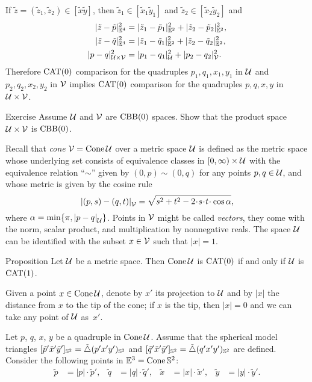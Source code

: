If $\tilde z=(\tilde z_1,\tilde z_2)\in [\tilde x\tilde y]$, then $\tilde z_1\in [\tilde x_1\tilde y_1]$ and $\tilde z_2\in [\tilde x_2\tilde y_2]$ and
\begin{align*}
\dist[2]{\tilde z}{\tilde p}{\EE^4}&=\dist[2]{\tilde z_1}{\tilde p_1}{\EE^2}+\dist[2]{\tilde z_2}{\tilde p_2}{\EE^2},
\\
\dist[2]{\tilde z}{\tilde q}{\EE^4}&=\dist[2]{\tilde z_1}{\tilde q_1}{\EE^2}+\dist[2]{\tilde z_2}{\tilde q_2}{\EE^2},
\\
\dist[2]{p}{q}{\spc{U}\times\spc{V}}&=\dist[2]{p_1}{q_1}{\spc{U}}+\dist[2]{p_2}{q_2}{\spc{V}}.
\end{align*}
Therefore $\mathrm{CAT}(0)$ comparison for the quadruples $p_1,q_1,x_1,y_1$ in $\mathcal{U}$
and 
$p_2,q_2,x_2,y_2$ in $\mathcal{V}$ implies 
$\mathrm{CAT}(0)$ comparison for the quadruples $p,q,x,y$ in $\mathcal{U}\times \mathcal{V}$.
\qeds

\begin{thm}{Exercise}\label{ex:product-CBB}
Assume $\mathcal{U}$ and $\mathcal{V}$ are $\mathrm{CBB}(0)$ spaces.
Show that the product space $\mathcal{U}\times\mathcal{V}$ is $\mathrm{CBB}(0)$.
\end{thm}

Recall that \label{page:cone}\emph{cone} $\mathcal{V}=\mathop{\rm Cone}\nolimits\mathcal{U}$ over a metric space $\mathcal{U}$
is defined as the metric space whose underlying set consists of
equivalence classes in
$[0,\infty)\times \mathcal{U}$ with the equivalence relation ``$\sim$'' given by $(0,p)\sim (0,q)$ for any points $p,q\in\mathcal{U}$,
and whose metric is given by the cosine rule
\[
\dist{(p,s)}{(q,t)}{\spc{V}} 
=
\sqrt{s^2+t^2-2\cdot s\cdot t\cdot \cos\alpha},
\]
where $\alpha= \min\{\pi, \dist{p}{q}{\spc{U}}\}$.
Points in $\mathcal{V}$ might be called \emph{vectors},
they come with the norm, scalar product, and multiplication by nonnegative reals.
The space $\mathcal{U}$ can be identified with the subset $x\in \mathcal{V}$ such that $|x|=1$.

\begin{thm}{Proposition}\label{ex:cone+susp}
Let $\mathcal{U}$ be a metric space.
Then $\mathop{\rm Cone}\nolimits\mathcal{U}$ is  $\mathrm{CAT}(0)$ if and only if $\mathcal{U}$ is $\mathrm{CAT}(1)$.
\end{thm}

Given a point $x\in \mathop{\rm Cone}\nolimits\mathcal{U}$, denote by $x'$ its projection to $\mathcal{U}$
and by $|x|$ the distance from $x$ to the tip of the cone;
if $x$ is the tip, then $|x|=0$ and we can take any point of $\mathcal{U}$ as~$x'$.

Let $p$, $q$, $x$, $y$
be a quadruple in $\mathop{\rm Cone}\nolimits\mathcal{U}$.
Assume that the spherical model triangles $[\tilde p'\tilde x'\tilde y']_{\mathbb{S}^2}=\tilde\triangle(p'x'y')_{\mathbb{S}^2}$ and $[\tilde q'\tilde x'\tilde y']_{\mathbb{S}^2}=\tilde\triangle(q'x'y')_{\mathbb{S}^2}$ are defined.
Consider the following points in $\mathbb{E}^3=\mathop{\rm Cone}\nolimits\mathbb{S}^2$: 
\begin{align*}
\tilde p&=|p|\cdot\tilde p',
&
\tilde q&=|q|\cdot\tilde q',
&
\tilde x&=|x|\cdot\tilde x',
&
\tilde y&=|y|\cdot\tilde y'.
\end{align*}

